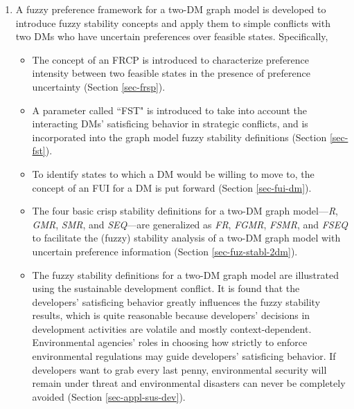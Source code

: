 \begin{enumerate}
\item A fuzzy preference framework for a two-DM graph model is developed to introduce fuzzy stability concepts and apply them to simple conflicts with two DMs who have uncertain preferences over feasible states. Specifically,
  \begin{itemize}
    \item The concept of an FRCP is introduced to characterize preference intensity between two feasible states in the presence of preference uncertainty (Section \ref{sec-frsp}).
    \item A parameter called ``FST" is introduced to take into account the interacting DMs' satisficing behavior in strategic conflicts, and is incorporated into the graph model fuzzy stability definitions (Section \ref{sec-fst}).
    \item To identify states to which a DM would be willing to move to, the concept of an FUI for a DM is put forward (Section \ref{sec-fui-dm}).
    \item The four basic crisp stability definitions for a two-DM graph model---\emph{R}, \emph{GMR}, \emph{SMR}, and \emph{SEQ}---are generalized as \emph{FR}, \emph{FGMR}, \emph{FSMR}, and \emph{FSEQ} to facilitate the (fuzzy) stability analysis of a two-DM graph model with uncertain preference information (Section \ref{sec-fuz-stabl-2dm}).
    \item The fuzzy stability definitions for a two-DM graph model are illustrated using the sustainable development conflict. It is found that the developers' satisficing behavior greatly influences the fuzzy stability results, which is quite reasonable because developers' decisions in development activities are volatile and mostly context-dependent. Environmental agencies' roles in choosing how strictly to enforce environmental regulations may guide developers' satisficing behavior. If developers want to grab every last penny, environmental security will remain under threat and environmental disasters can never be completely avoided (Section \ref{sec-appl-sus-dev}).
  \end{itemize}


\end{enumerate}
